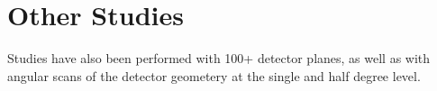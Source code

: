 \section{Other Studies}

Studies have also been performed with 100+ detector planes, as well as with angular scans of the detector geometery at the single and half degree level. 
